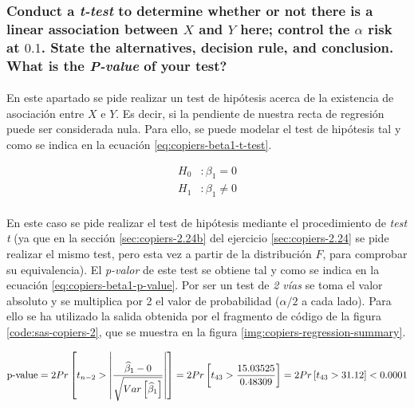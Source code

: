 \documentclass{article}
\begin{document}
      \subsubsection{Conduct a \emph{t-test} to determine whether or not there is a linear association between $X$ and $Y$ here; control the $\alpha$ risk at $0.1$. State the alternatives, decision rule, and conclusion. What is the \emph{P-value} of your test?}
      \label{sec:copiers-2.5b}

        \paragraph{}
        En este apartado se pide realizar un test de hipótesis acerca de la existencia de asociación entre $X$ e $Y$. Es decir, si la pendiente de nuestra recta de regresión puede ser considerada nula. Para ello, se puede modelar el test de hipótesis tal y como se indica en la ecuación \eqref{eq:copiers-beta1-t-test}.

        \begin{equation}
        \label{eq:copiers-beta1-t-test}
          \begin{split}
            H_0&: \beta_1 = 0 \\
            H_1&: \beta_1 \neq 0
          \end{split}
        \end{equation}

        \paragraph{}
        En este caso se pide realizar el test de hipótesis mediante el procedimiento de \emph{test t} (ya que en la sección \ref{sec:copiers-2.24b} del ejercicio \ref{sec:copiers-2.24} se pide realizar el mismo test, pero esta vez a partir de la distribución $F$, para comprobar su equivalencia). El \emph{p-valor} de este test se obtiene tal y como se indica en la ecuación \eqref{eq:copiers-beta1-p-value}. Por ser un test de \emph{2 vías} se toma el valor absoluto y se multiplica por 2 el valor de probabilidad ($\alpha/2$ a cada lado). Para ello se ha utilizado la salida obtenida por el fragmento de código de la figura \ref{code:sas-copiers-2}, que se muestra en la figura \ref{img:copiers-regression-summary}.

        \begin{equation}
        \label{eq:copiers-beta1-p-value}
          \text{p-value}
          = 2Pr\left[t_{n-2} > \left|\frac{\widehat{\beta}_1 - 0}{\sqrt{Var\left[\widehat{\beta}_1\right]}}\right|\right]
          = 2Pr\left[t_{43} > \frac{15.03525}{0.48309}\right]
          = 2Pr\left[t_{43} > 31.12\right]
          < 0.0001
        \end{equation}
\end{document}
